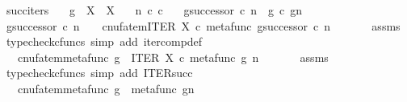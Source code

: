 \begin{isabellebody}
\ succ{\isacharunderscore}{\kern0pt}iters{\isacharcolon}{\kern0pt}\isanewline
\ \ \ {\isachardoublequoteopen}g\ {\isacharcolon}{\kern0pt}\ X\ {\isasymrightarrow}\ X{\isachardoublequoteclose}\isanewline
\ \ \ {\isachardoublequoteopen}n\ {\isasymin}\isactrlsub c\ {\isasymnat}\isactrlsub c{\isachardoublequoteclose}\isanewline
\ \ \ {\isachardoublequoteopen}g\isactrlbsup {\isasymcirc}{\isacharparenleft}{\kern0pt}successor\ {\isasymcirc}\isactrlsub c\ n{\isacharparenright}{\kern0pt}\isactrlesup \ {\isacharequal}{\kern0pt}\ g\ {\isasymcirc}\isactrlsub c\ {\isacharparenleft}{\kern0pt}g\isactrlbsup {\isasymcirc}n\isactrlesup {\isacharparenright}{\kern0pt}{\isachardoublequoteclose}\ \ \ \ \isanewline
%
\isadelimproof
%
\endisadelimproof
%
\isatagproof
{}\isamarkupfalse%
\ {\isacharminus}{\kern0pt}\ \isanewline
\ \ \isamarkupfalse%
\ {\isachardoublequoteopen}g\isactrlbsup {\isasymcirc}successor\ {\isasymcirc}\isactrlsub c\ n\isactrlesup \ \ \ {\isacharequal}{\kern0pt}\ cnufatem{\isacharparenleft}{\kern0pt}ITER\ X\ {\isasymcirc}\isactrlsub c\ {\isasymlangle}metafunc\ g{\isacharcomma}{\kern0pt}successor\ {\isasymcirc}\isactrlsub c\ n\ {\isasymrangle}{\isacharparenright}{\kern0pt}{\isachardoublequoteclose}\isanewline
\ \ \ \ \isamarkupfalse%
\ assms\ \isamarkupfalse%
\ {\isacharparenleft}{\kern0pt}typecheck{\isacharunderscore}{\kern0pt}cfuncs{\isacharcomma}{\kern0pt}\ simp\ add{\isacharcolon}{\kern0pt}\ iter{\isacharunderscore}{\kern0pt}comp{\isacharunderscore}{\kern0pt}def{}{\isacharparenright}{\kern0pt}\isanewline
\ \ \isamarkupfalse%
\ \isamarkupfalse%
\ {\isachardoublequoteopen}{\isachardot}{\kern0pt}{\isachardot}{\kern0pt}{\isachardot}{\kern0pt}\ {\isacharequal}{\kern0pt}\ cnufatem{\isacharparenleft}{\kern0pt}metafunc\ g\ {\isasymbox}\ ITER\ X\ {\isasymcirc}\isactrlsub c\ {\isasymlangle}metafunc\ g{\isacharcomma}{\kern0pt}\ n\ {\isasymrangle}{\isacharparenright}{\kern0pt}{\isachardoublequoteclose}\isanewline
\ \ \ \ \isamarkupfalse%
\ assms\ \isamarkupfalse%
\ {\isacharparenleft}{\kern0pt}typecheck{\isacharunderscore}{\kern0pt}cfuncs{\isacharcomma}{\kern0pt}\ simp\ add{\isacharcolon}{\kern0pt}\ ITER{\isacharunderscore}{\kern0pt}succ{\isacharparenright}{\kern0pt}\isanewline
\ \ \isamarkupfalse%
\ \isamarkupfalse%
\ {\isachardoublequoteopen}{\isachardot}{\kern0pt}{\isachardot}{\kern0pt}{\isachardot}{\kern0pt}\ {\isacharequal}{\kern0pt}\ cnufatem{\isacharparenleft}{\kern0pt}metafunc\ g\ {\isasymbox}\ metafunc\ {\isacharparenleft}{\kern0pt}g\isactrlbsup {\isasymcirc}n\isactrlesup {\isacharparenright}{\kern0pt}{\isacharparenright}{\kern0pt}{\isachardoublequoteclose}\isanewline

\end{isabellebody}
